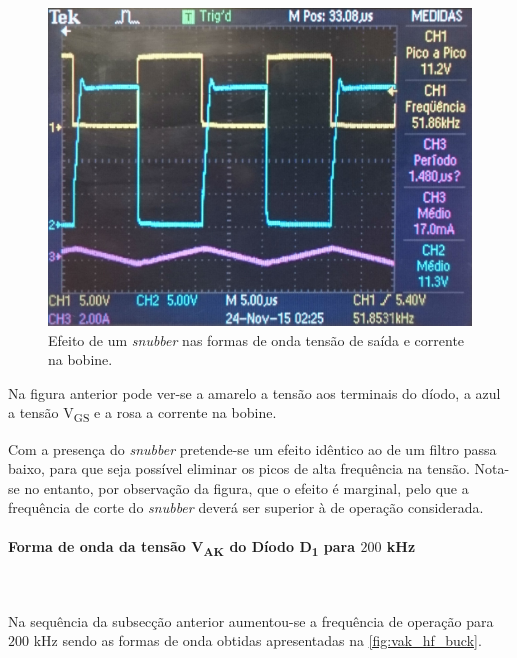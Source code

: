 \documentclass[a4paper,11pt]{article}
\numberwithin{equation}{section}
\begin{document}
\begin{figure}[H]
	\centering
	\includegraphics[keepaspectratio=true, scale=0.175]{img/figs/snubber_buck}
	\caption{Efeito de um \textit{snubber} nas formas de onda tensão de saída e corrente na bobine.}
	\label{fig:snubber_buck}
	\vspace{-0.8em}
\end{figure}

Na figura anterior pode ver-se a amarelo a tensão aos terminais do díodo, a azul a tensão V\textsubscript{GS} e a rosa a corrente na bobine.

Com a presença do \textit{snubber} pretende-se um efeito idêntico ao de um filtro passa baixo, para que seja possível eliminar os picos de alta frequência na tensão. Nota-se no entanto, por observação da figura, que o efeito é marginal, pelo que a frequência de corte do \textit{snubber} deverá ser superior à de operação considerada.

\paragraph{Forma de onda da tensão V\textsubscript{AK} do Díodo D\textsubscript{1} para $200$ kHz}\mbox{}\

Na sequência da subsecção anterior aumentou-se a frequência de operação para $200$ kHz sendo as formas de onda obtidas apresentadas na \autoref{fig:vak_hf_buck}.
\end{document}
